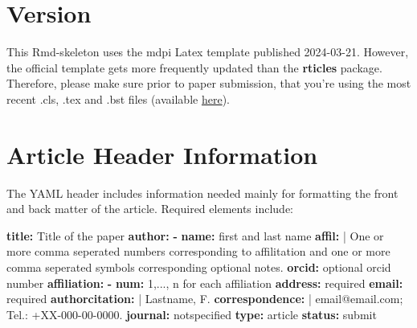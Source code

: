 \documentclass[notspecified,article,submit,moreauthors,pdftex]{Definitions/mdpi}
\newenvironment{Shaded}{\begin{snugshade}}{\end{snugshade}}
\newcommand{\AttributeTok}[1]{\textcolor[rgb]{0.13,0.29,0.53}{#1}}
\newcommand{\CharTok}[1]{\textcolor[rgb]{0.31,0.60,0.02}{#1}}
\newcommand{\FunctionTok}[1]{\textcolor[rgb]{0.13,0.29,0.53}{\textbf{#1}}}
\newcommand{\KeywordTok}[1]{\textcolor[rgb]{0.13,0.29,0.53}{\textbf{#1}}}
\newcommand{\NormalTok}[1]{#1}
\begin{document}

\section{Version}\label{version}

This Rmd-skeleton uses the mdpi Latex template published 2024-03-21.
However, the official template gets more frequently updated than the
\textbf{rticles} package. Therefore, please make sure prior to paper
submission, that you're using the most recent .cls, .tex and .bst files
(available \href{http://www.mdpi.com/authors/latex}{here}).

\section{Article Header Information}\label{article-header-information}

The YAML header includes information needed mainly for formatting the
front and back matter of the article. Required elements include:

\begin{Shaded}
\begin{Highlighting}[]
\FunctionTok{title}\KeywordTok{:}\AttributeTok{ Title of the paper}
\FunctionTok{author}\KeywordTok{:}
\AttributeTok{  }\KeywordTok{{-}}\AttributeTok{ }\FunctionTok{name}\KeywordTok{:}\AttributeTok{ first and last name}
\FunctionTok{    affil}\KeywordTok{: }\CharTok{|}
\NormalTok{      One or more comma seperated numbers corresponding to affilitation}
\NormalTok{      and one or more  comma seperated symbols corresponding }
\NormalTok{      optional notes.}
\AttributeTok{    }\FunctionTok{orcid}\KeywordTok{:}\AttributeTok{ optional orcid number}
\FunctionTok{affiliation}\KeywordTok{:}\AttributeTok{  }
\AttributeTok{  }\KeywordTok{{-}}\AttributeTok{ }\FunctionTok{num}\KeywordTok{:}\AttributeTok{ 1,..., n for each affiliation}
\AttributeTok{    }\FunctionTok{address}\KeywordTok{:}\AttributeTok{ required}
\AttributeTok{    }\FunctionTok{email}\KeywordTok{:}\AttributeTok{ required}
\FunctionTok{authorcitation}\KeywordTok{: }\CharTok{|}
\NormalTok{  Lastname, F.}
\FunctionTok{correspondence}\KeywordTok{: }\CharTok{|}
\NormalTok{  email@email.com; Tel.: +XX{-}000{-}00{-}0000.}
\FunctionTok{journal}\KeywordTok{:}\AttributeTok{ notspecified}
\FunctionTok{type}\KeywordTok{:}\AttributeTok{ article}
\FunctionTok{status}\KeywordTok{:}\AttributeTok{ submit}
\end{Highlighting}
\end{Shaded}
\end{document}
